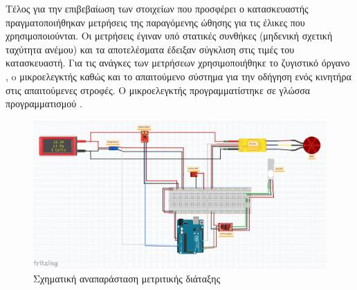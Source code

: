 Τέλος για την επιβεβαίωση των στοιχείων που προσφέρει ο κατασκευαστής 
πραγματοποιήθηκαν μετρήσεις της παραγόμενης ώθησης για τις έλικες που  
χρησιμοποιούνται. Οι μετρήσεις έγιναν υπό στατικές συνθήκες (μηδενική σχετική 
ταχύτητα ανέμου) και τα αποτελέσματα έδειξαν σύγκλιση στις τιμές του 
κατασκευαστή. Για τις ανάγκες των μετρήσεων χρησιμοποιήθηκε το ζυγιστικό 
όργανο , o μικροελεγκτής  καθώς και 
το απαιτούμενο σύστημα για την οδήγηση ενός κινητήρα στις απαιτούμενες στροφές. 
Ο μικροελεγκτής προγραμματίστηκε σε γλώσσα προγραμματισμού .
\begin{figure}[H]
    \centering
    \includegraphics[width=\textwidth]{Propeller/schematic.png} 
    \caption{Σχηματική αναπαράσταση μετριτικής διάταξης}
\end{figure}
